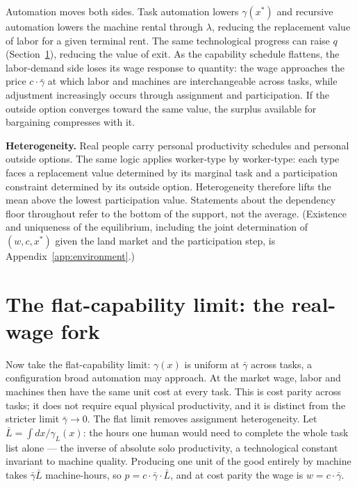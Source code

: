 \documentclass[12pt]{article}
\theoremstyle{plain}
\begin{document}
Automation moves both sides. Task automation lowers $\gamma(x^*)$ and recursive
automation lowers the machine rental through $\lambda$, reducing the replacement
value of labor for a given terminal rent. The same technological progress can
raise $q$ (Section~\ref{sec:limit}), reducing the value of exit. As the capability
schedule flattens, the labor-demand side loses its wage response to quantity: the
wage approaches the price $c\cdot\bar{\gamma}$ at which labor and machines are
interchangeable across tasks, while adjustment increasingly occurs through
assignment and participation. If the outside option
converges toward the same value, the surplus available for bargaining compresses
with it.

\textbf{Heterogeneity.} Real people carry personal productivity schedules and
personal outside options. The same logic applies worker-type by worker-type:
each type faces a replacement value determined by its marginal task and a
participation constraint determined by its outside option. Heterogeneity
therefore lifts the mean above the lowest participation value. Statements about
the dependency floor throughout refer to the bottom of the support, not the
average. (Existence and uniqueness of the equilibrium, including the joint
determination of $(w,c,x^*)$ given the land market and the participation step,
is Appendix~\ref{app:environment}.)

\section{The flat-capability limit: the real-wage fork}\label{sec:limit}

Now take the flat-capability limit: $\gamma(x)$ is uniform at $\bar{\gamma}$ across tasks, a configuration broad automation may approach. At the market wage, labor and machines then have the same unit cost at every task. This is cost parity across tasks; it does not require equal physical productivity, and it is distinct from the stricter limit $\bar{\gamma}\to0$. The flat limit removes assignment heterogeneity. Let $\bar{L} = \int dx/\gamma _L(x)$: the hours one human would need to complete the whole task list alone --- the inverse of absolute solo productivity, a technological constant invariant to machine quality. Producing one unit of the good entirely by machine takes $\bar{\gamma}\bar{L}$ machine-hours, so $p = c\cdot \bar{\gamma}\cdot \bar{L}$, and at cost parity the wage is $w = c\cdot \bar{\gamma}$.
\end{document}
